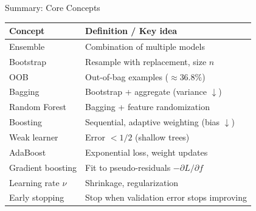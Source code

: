 \begin{frame}{Summary: Core Concepts}
  \renewcommand{\arraystretch}{1.5}
  \begin{center}
  \begin{tabular}{ll}
    \toprule
    \textbf{Concept} & \textbf{Definition / Key idea} \\
    \midrule
    Ensemble & Combination of multiple models \\
    Bootstrap & Resample with replacement, size $n$ \\
    OOB & Out-of-bag examples ($\approx 36.8\%$) \\
    Bagging & Bootstrap + aggregate (variance $\downarrow$) \\
    Random Forest & Bagging + feature randomization \\
    Boosting & Sequential, adaptive weighting (bias $\downarrow$) \\
    Weak learner & Error $< 1/2$ (shallow trees) \\
    AdaBoost & Exponential loss, weight updates \\
    Gradient boosting & Fit to pseudo-residuals $-\partial L/\partial f$ \\
    Learning rate $\nu$ & Shrinkage, regularization \\
    Early stopping & Stop when validation error stops improving \\
    \bottomrule
  \end{tabular}
  \end{center}
\end{frame}

